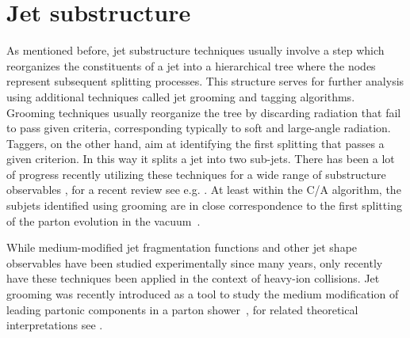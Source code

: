 
\section{Jet substructure}
\label{sec:jetsubstructure}

As mentioned before, jet substructure techniques usually involve a step which reorganizes the constituents of a jet into a hierarchical tree where the nodes represent subsequent splitting processes.
This structure serves for further analysis using additional techniques called jet grooming and tagging algorithms.
Grooming techniques usually reorganize the tree by discarding radiation that fail to pass given criteria, corresponding typically to soft and large-angle radiation. Taggers, on the other hand, aim at identifying the first splitting that passes a given criterion. In this way it splits a jet into two sub-jets. There has been a lot of progress recently utilizing these techniques for a wide range of substructure observables \cite{Butterworth:2008iy,Ellis:2009me,Krohn:2009th,Dasgupta:2013ihk,Larkoski:2014wba}, for a recent review see e.g. \cite{Larkoski:2017jix}. At least within the C/A algorithm, the subjets identified using grooming are in close correspondence to 
the first splitting of the parton evolution in the vacuum~\cite{Altarelli:1977zs,Larkoski:2015lea}.

While medium-modified jet fragmentation functions and other jet shape observables have been studied experimentally since many years, only recently have these techniques been applied in the context of heavy-ion collisions.
Jet grooming was recently introduced as a tool to study the medium modification of leading partonic components in a parton shower~\cite{Sirunyan:2017bsd}, for related theoretical interpretations see \cite{Chien:2016led,Mehtar-Tani:2016aco,Milhano:2017nzm,Chang:2017gkt}. 

